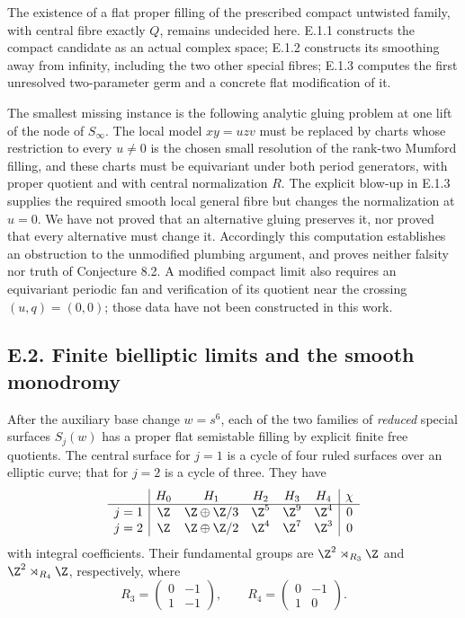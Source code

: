 \begin{problem}\label{fam:src:E.1.5}\label{fam:st:E.1.5}
The existence of a flat proper filling of the prescribed compact
untwisted family, with central fibre exactly $Q$, remains undecided
here. E.1.1 constructs the compact candidate as an actual complex
space; E.1.2 constructs its smoothing away from infinity, including
the two other special fibres; E.1.3 computes the first unresolved
two-parameter germ and a concrete flat modification of it.

The smallest missing instance is the following analytic gluing
problem at one lift of the node of $S_\infty$. The local model
$xy=uzv$ must be replaced by charts whose restriction to every
$u\ne0$ is the chosen small resolution of the rank-two Mumford
filling, and these charts must be equivariant under both period
generators, with proper quotient and with central normalization $R$.
The explicit blow-up in E.1.3 supplies the required smooth local
general fibre but changes the normalization at $u=0$. We have not
proved that an alternative gluing preserves it, nor proved that every
alternative must change it. Accordingly this computation establishes
an obstruction to the unmodified plumbing argument, and proves
neither falsity nor truth of Conjecture 8.2. A modified compact limit
also requires an equivariant periodic fan and verification of its
quotient near the crossing $(u,q)=(0,0)$; those data have not been
constructed in this work.
\end{problem}

\subsection{E.2. Finite bielliptic limits and the smooth monodromy}

\begin{proposition}\label{fam:src:E.2.1}\label{fam:st:E.2.1}
After the auxiliary base change $w=s^6$, each of the two families of
\emph{reduced} special surfaces $S_j(w)$ has a proper flat
semistable filling by explicit finite free quotients. The central
surface for $j=1$ is a cycle of four ruled surfaces over an elliptic
curve; that for $j=2$ is a cycle of three. They have
\[
\begin{array}{c|ccccc|c}
 &H_0&H_1&H_2&H_3&H_4&\chi\\\hline
 j=1&\Z&\Z\oplus\Z/3&\Z^5&\Z^9&\Z^4&0\\
 j=2&\Z&\Z\oplus\Z/2&\Z^4&\Z^7&\Z^3&0
\end{array}
\]
with integral coefficients. Their fundamental groups are
$\Z^2\rtimes_{R_3}\Z$ and $\Z^2\rtimes_{R_4}\Z$, respectively,
where
\[
 R_3=\begin{pmatrix}0&-1\\1&-1\end{pmatrix},\qquad
 R_4=\begin{pmatrix}0&-1\\1&0\end{pmatrix}.
\]
\end{proposition}

